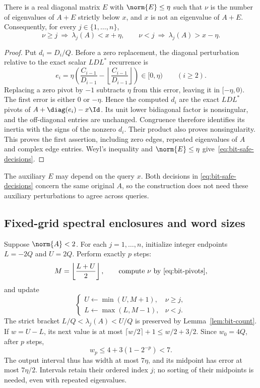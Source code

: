 \begin{lemma}\label{lem:bit-count}
There is a real diagonal matrix $E$ with $\norm{E}\leq\eta$ such that
$\nu$ is the number of eigenvalues of $A+E$ strictly below $x$, and
$x$ is not an eigenvalue of $A+E$. Consequently, for every
$j\in\{1,\ldots,n\}$,
\begin{equation}\label{eq:bit-safe-decisions}
 \nu\geq j\ \Longrightarrow\ \lambda_j(A)<x+\eta,
 \qquad
 \nu<j\ \Longrightarrow\ \lambda_j(A)>x-\eta.
\end{equation}
\end{lemma}

\begin{proof}
Put $d_i=D_i/Q$. Before a zero replacement, the diagonal perturbation
relative to the exact scalar $LDL^*$ recurrence is
\[
 e_i=\eta\left(
       \frac{C_{i-1}}{D_{i-1}}-
       \left\lfloor\frac{C_{i-1}}{D_{i-1}}\right\rfloor
       \right)\in[0,\eta)\qquad(i\geq2).
\]
Replacing a zero pivot by $-1$ subtracts $\eta$ from this error,
leaving it in $[-\eta,0)$. The first error is either $0$ or
$-\eta$. Hence the computed $d_i$ are the exact $LDL^*$ pivots of
$A+\diag(e_i)-x\Id$. Its unit lower bidiagonal factor is
nonsingular, and the off-diagonal entries are unchanged. Congruence
therefore identifies its inertia with the signs of the nonzero
$d_i$. Their product also proves nonsingularity. This proves the
first assertion, including zero edges, repeated eigenvalues of $A$
and complex edge entries. Weyl's inequality and $\norm{E}\leq\eta$
give~\eqref{eq:bit-safe-decisions}.
\end{proof}

The auxiliary $E$ may depend on the query $x$. Both decisions in
\eqref{eq:bit-safe-decisions} concern the same original $A$, so the
construction does not need these auxiliary perturbations to agree
across queries.

\subsection{Fixed-grid spectral enclosures and word sizes}
\label{subsec:bit-bisection}

Suppose $\norm{A}<2$. For each $j=1,\ldots,n$, initialize integer
endpoints $L=-2Q$ and $U=2Q$. Perform exactly $p$ steps:
\[
 M=\left\lfloor\frac{L+U}{2}\right\rfloor,
 \qquad\text{compute $\nu$ by~\eqref{eq:bit-pivots}},
\]
and update
\begin{equation}\label{eq:bit-bisection}
 \begin{cases}
 U\gets\min(U,M+1),&\nu\geq j,\\
 L\gets\max(L,M-1),&\nu<j.
 \end{cases}
\end{equation}
The strict bracket $L/Q<\lambda_j(A)<U/Q$ is preserved by
Lemma~\ref{lem:bit-count}. If $w=U-L$, its next value is at most
$\lceil w/2\rceil+1\leq w/2+3/2$. Since $w_0=4Q$, after $p$
steps,
\begin{equation}\label{eq:bit-width}
 w_p\leq4+3(1-2^{-p})<7.
\end{equation}
The output interval thus has width at most $7\eta$, and its
midpoint has error at most $7\eta/2$. Intervals retain their ordered
index $j$; no sorting of their midpoints is needed, even with
repeated eigenvalues.

